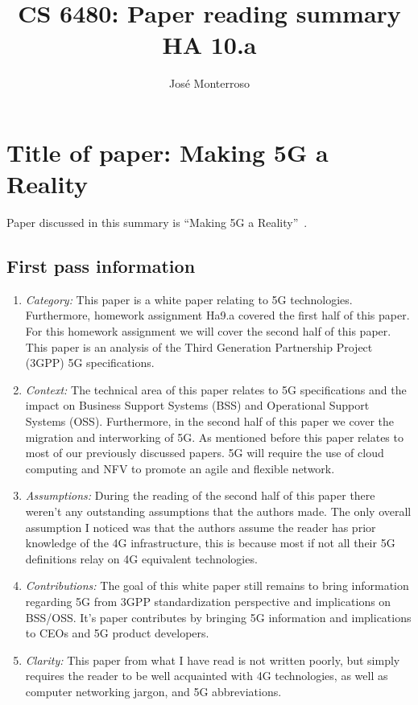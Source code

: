 \documentclass[letterpaper,twocolumn,10pt]{article}
\title{CS 6480: Paper reading summary\\
HA 10.a\\}
\author{José Monterroso}
\affil{School of Computing, University of Utah}
\begin{document}
\maketitle
\section{Title of paper: Making 5G a Reality}

Paper discussed in this summary is ``Making 5G a Reality''~\cite{5gwhite}.

\subsection{First pass information}
\label{sec:first}

\begin{enumerate}

\item {\it Category:}
This paper is a white paper relating to 5G technologies. Furthermore, homework assignment Ha9.a covered
the first half of this paper. For this homework assignment we will cover the second half of this paper. This 
paper is an analysis of the Third Generation Partnership Project (3GPP) 5G specifications. 

\item {\it Context:}
The technical area of this paper relates to 5G specifications and the impact on Business Support Systems 
(BSS) and Operational Support Systems (OSS). Furthermore, in the second half of this paper we cover the 
migration and interworking of 5G. As mentioned before this paper relates to most of our previously discussed 
papers. 5G will require the use of cloud computing and NFV to promote an agile and flexible network. 

\item {\it Assumptions:}  
During the reading of the second half of this paper there weren't any outstanding assumptions that the authors
made. The only overall assumption I noticed was that the authors assume the reader has prior knowledge of the 
4G infrastructure, this is because most if not all their 5G definitions relay on 4G equivalent technologies. 

\item {\it Contributions:}
The goal of this white paper still remains to bring information regarding 5G from 3GPP standardization
perspective and implications on BSS/OSS. It's paper contributes by bringing 5G information and implications
to CEOs and 5G product developers. 

\item {\it Clarity:} 
This paper from what I have read is not written poorly, but simply requires the reader to be well acquainted 
with 4G technologies, as well as computer networking jargon, and 5G abbreviations. 

\end{enumerate}
\end{document}
